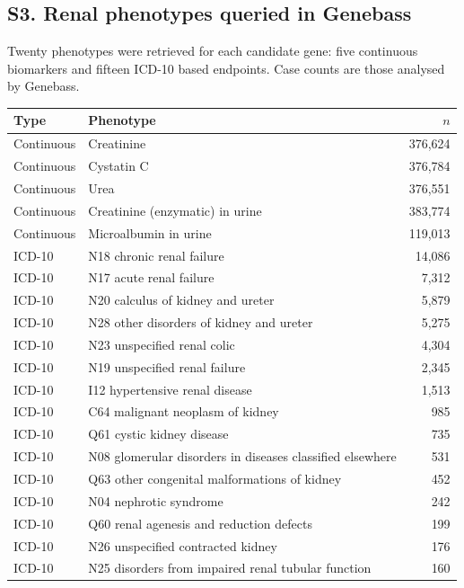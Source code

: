\documentclass[11pt,a4paper]{article}
\begin{document}
\subsection*{S3. Renal phenotypes queried in Genebass}

Twenty phenotypes were retrieved for each candidate gene: five continuous biomarkers and
fifteen ICD-10 based endpoints. Case counts are those analysed by Genebass.

\begin{table}[htbp]
\centering
\small
\begin{tabular}{llr}
\toprule
Type & Phenotype & $n$ \\
\midrule
Continuous & Creatinine & 376,624 \\
Continuous & Cystatin C & 376,784 \\
Continuous & Urea & 376,551 \\
Continuous & Creatinine (enzymatic) in urine & 383,774 \\
Continuous & Microalbumin in urine & 119,013 \\
\midrule
ICD-10 & N18 chronic renal failure & 14,086 \\
ICD-10 & N17 acute renal failure & 7,312 \\
ICD-10 & N20 calculus of kidney and ureter & 5,879 \\
ICD-10 & N28 other disorders of kidney and ureter & 5,275 \\
ICD-10 & N23 unspecified renal colic & 4,304 \\
ICD-10 & N19 unspecified renal failure & 2,345 \\
ICD-10 & I12 hypertensive renal disease & 1,513 \\
ICD-10 & C64 malignant neoplasm of kidney & 985 \\
ICD-10 & Q61 cystic kidney disease & 735 \\
ICD-10 & N08 glomerular disorders in diseases classified elsewhere & 531 \\
ICD-10 & Q63 other congenital malformations of kidney & 452 \\
ICD-10 & N04 nephrotic syndrome & 242 \\
ICD-10 & Q60 renal agenesis and reduction defects & 199 \\
ICD-10 & N26 unspecified contracted kidney & 176 \\
ICD-10 & N25 disorders from impaired renal tubular function & 160 \\
\bottomrule
\end{tabular}
\end{table}
\end{document}
